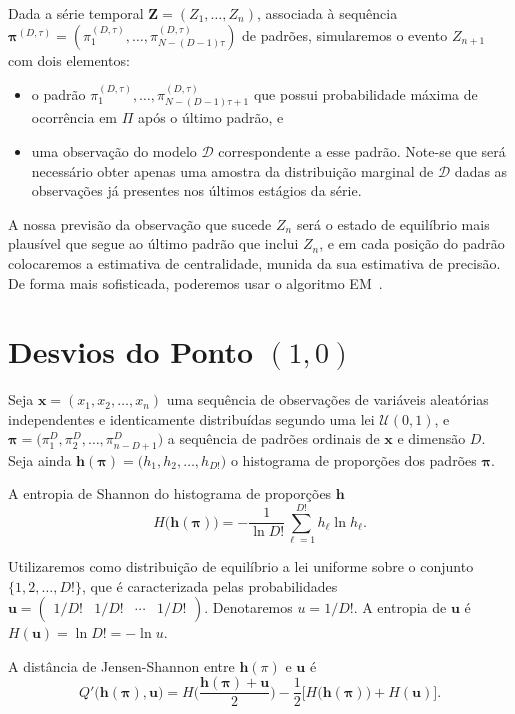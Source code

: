 \documentclass[10pt]{article}
\begin{document}
Dada a série temporal $\bm Z=(Z_1,\dots,Z_n)$, associada à sequência $\bm \pi^{(D,\tau)} = (\pi^{(D,\tau)}_1,\dots,\pi^{(D,\tau)}_{N-(D-1)\tau})$ de padrões, simularemos o evento $Z_{n+1}$ com dois elementos:
\begin{itemize}
	\item o padrão $\pi^{(D,\tau)}_1,\dots,\pi^{(D,\tau)}_{N-(D-1)\tau+1}$ que possui probabilidade máxima de ocorrência em $\Pi$ após o último padrão, e
	\item uma observação do modelo $\mathcal D$ correspondente a esse padrão. Note-se que será necessário obter apenas uma amostra da distribuição marginal de $\mathcal D$ dadas as observações já presentes nos últimos estágios da série.
\end{itemize} 

A nossa previsão da observação que sucede $Z_n$ será o estado de equilíbrio mais plausível que segue ao último padrão que inclui $Z_n$, e em cada posição do padrão colocaremos a estimativa de centralidade, munida da sua estimativa de precisão.
De forma mais sofisticada, poderemos usar o algoritmo EM~\citep{dempster_em}.

\section{Desvios do Ponto $(1,0)$}

Seja $\bm x=(x_1,x_2,\dots,x_n)$ uma sequência de observações de variáveis aleatórias independentes e identicamente distribuídas segundo uma lei $\mathcal U(0,1)$, e $\bm \pi = \big( \pi^D_1,\pi^D_2,\dots,\pi^D_{n-D+1} \big)$ a sequência de padrões ordinais de $\bm x$ e dimensão $D$.
Seja ainda $\bm h(\bm \pi)=\big(h_1,h_2,\dots,h_{D!}\big)$ o histograma de proporções dos padrões $\bm \pi$.

A entropia de Shannon do histograma de proporções $\bm h$
\begin{equation}
	H\big(\bm h(\bm \pi)\big) = -\frac{1}{\ln D!} \sum_{\ell=1}^{D!} h_\ell \ln h_\ell .
	\label{eq:entropia}
\end{equation}

Utilizaremos como distribuição de equilíbrio a lei uniforme sobre o conjunto $\{1,2,\dots,D!\}$, que é caracterizada pelas probabilidades $\bm u =\begin{pmatrix}
1/D! &1/D! &\cdots &1/D!
\end{pmatrix} $.
Denotaremos $u=1/D!$.
A entropia de $\bm u$ é $H(\bm u) = \ln D! = -\ln u$.

A distância de Jensen-Shannon entre $\bm h(\pi)$ e $\bm u$ é 
\begin{equation}
	Q'\big(\bm h(\bm \pi), \bm u\big) = H\Big(\frac{\bm h(\bm \pi) + \bm u}{2}\Big) -\frac12\big[H\big(\bm h(\bm \pi)\big) + H(\bm u)\big].
	\label{eq:distancia}
\end{equation}
\end{document}
